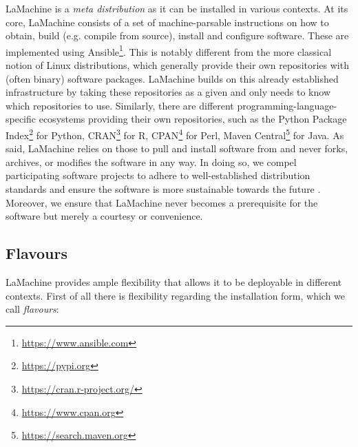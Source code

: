 \documentclass[a4paper,11pt]{article}
\begin{document}
LaMachine is a \emph{meta distribution} as it can be installed in various contexts. At its core, LaMachine consists of a
set of machine-parsable instructions on how to obtain, build (e.g. compile from source), install and configure software.
These are implemented using Ansible\footnote{\url{https://www.ansible.com}}.  This is notably different from the more
classical notion of Linux distributions, which generally provide their own repositories with (often binary) software
packages. LaMachine builds on this already established infrastructure by taking these repositories as a given and only
needs to know which repositories to use.  Similarly, there are different programming-language-specific ecosystems
providing their own repositories, such as the Python Package Index\footnote{\url{https://pypi.org}} for Python, CRAN\footnote{\url{https://cran.r-project.org/}} for R, CPAN\footnote{\url{https://www.cpan.org}} for Perl, Maven Central\footnote{\url{https://search.maven.org}} for Java.  As said, LaMachine relies on those to pull and install software from and never forks, archives, or modifies the software in any way. In doing so, we compel participating software projects to adhere to well-established distribution standards and ensure the software is more sustainable towards the future \cite{softwarequality}. Moreover, we ensure that LaMachine never becomes a prerequisite for the software but merely a courtesy or convenience.

\subsection{Flavours}

LaMachine provides ample flexibility that allows it to be deployable in different contexts. First of all there is
flexibility regarding the installation form, which we call \emph{flavours}:
\end{document}
